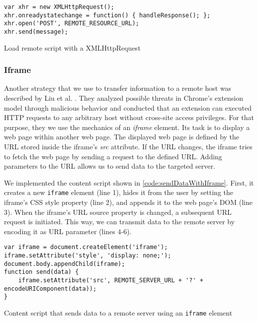 	\begin{code}
		\begin{lstlisting}
var xhr = new XMLHttpRequest();
xhr.onreadystatechange = function() { handleResponse(); };
xhr.open('POST', REMOTE_RESOURCE_URL);
xhr.send(message);
		\end{lstlisting}
		\caption{Load remote script with a XMLHttpRequest}
		\label{code:xhr}
	\end{code}

\subsubsection{Iframe}

	Another strategy that we use to transfer information to a remote host was described by Liu et al. \cite{Liu12chromeextensions:}. They analyzed possible threats in Chrome's extension model through malicious behavior and conducted that an extension can executed HTTP requests to any arbitrary host without cross-site access privileges. For that purpose, they we use the mechanics of an \textit{iframe} element. Its task is to display a web page within another web page. The displayed web page is defined by the URL stored inside the iframe's \textit{src} attribute. If the URL changes, the iframe tries to fetch the web page by sending a request to the defined URL. Adding parameters to the URL allows us to send data to the targeted server. 

	We implemented the content script shown in \autoref{code:sendDataWithIframe}. First, it creates a new \texttt{iframe} element (line 1), hides it from the user by setting the iframe's CSS style property (line 2), and appends it to the web page's DOM (line 3). When the iframe's URL source property is changed, a subsequent URL request is initiated. This way, we can transmit data to the remote server by encoding it as URL parameter (lines 4-6).

\begin{code}
	\begin{lstlisting}
var iframe = document.createElement('iframe');
iframe.setAttribute('style', 'display: none;');
document.body.appendChild(iframe);
function send(data) {
	iframe.setAttribute('src', REMOTE_SERVER_URL + '?' + encodeURIComponent(data));
}
	\end{lstlisting}
	\caption{Content script that sends data to a remote server using an \texttt{iframe} element}
	\label{code:sendDataWithIframe}
\end{code}

